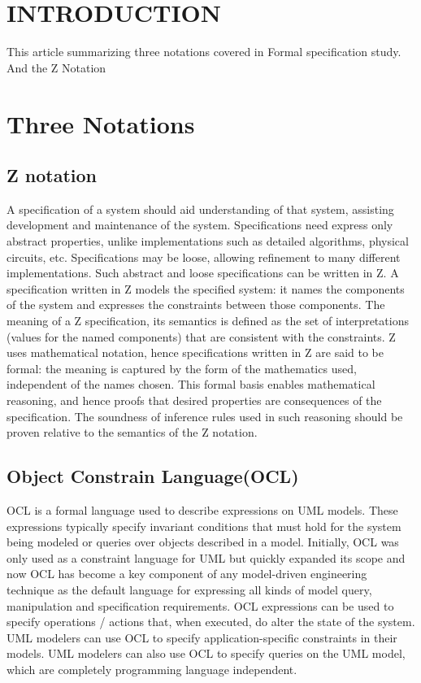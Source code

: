 \section{INTRODUCTION}
This article summarizing three notations covered in Formal specification study. And the  Z Notation


\section{Three Notations}
\subsection{Z notation}
A specification of a system should aid understanding of that system, assisting development and maintenance of the system. Specifications need express only abstract properties, unlike implementations such as detailed algorithms, physical circuits, etc. Specifications may be loose, allowing refinement to many different implementations. Such abstract and loose specifications can be written in Z.
A specification written in Z models the specified system: it names the components of the system and expresses the constraints between those components. The meaning of a Z specification, its semantics is defined as the set of interpretations (values for the named components) that are consistent with the constraints.
Z uses mathematical notation, hence specifications written in Z are said to be formal: the meaning is captured by the form of the mathematics used, independent of the names chosen. This formal basis enables mathematical reasoning, and hence proofs that desired properties are consequences of the specification. The soundness of inference rules used in such reasoning should be proven relative to the semantics of the Z notation.
\subsection{Object Constrain Language(OCL)}
OCL is a formal language used to describe expressions on UML models. These expressions typically specify invariant conditions that must hold for the system being modeled or queries over objects described in a model.
Initially, OCL was only used as a constraint language for UML but quickly expanded its scope and now OCL has become a key component of any model-driven engineering technique as the default language for expressing all kinds of model query, manipulation and specification requirements. OCL expressions can be used to specify operations / actions that, when executed, do alter the state of the system. UML modelers can use OCL to specify application-specific constraints in their models. UML modelers can also use OCL to specify queries on the UML model, which are completely programming language independent.
